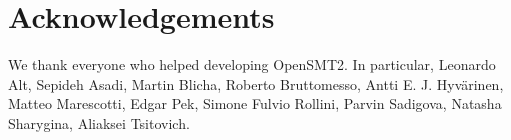 \documentclass{easychair}
\begin{document}
\section{Acknowledgements}
We thank everyone who helped
developing OpenSMT2. In particular,
Leonardo Alt,
Sepideh Asadi,
Martin Blicha,
Roberto Bruttomesso,
Antti E. J. Hyv{\"a}rinen,
Matteo Marescotti,
Edgar Pek,
Simone Fulvio Rollini, 
Parvin Sadigova,
Natasha Sharygina,
Aliaksei Tsitovich.
\fi



\end{document}
